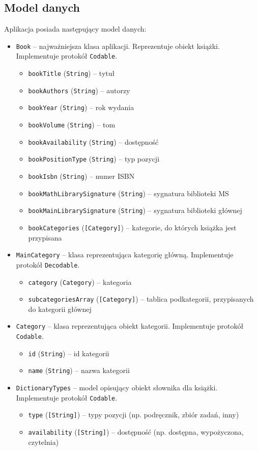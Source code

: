\documentclass[twoside]{projektInzynierskiMS}
\begin{document}
\subsection{Model danych}
Aplikacja posiada następujący model danych:
\begin{itemize}
\item \verb`Book` -- najważniejsza klasa aplikacji. Reprezentuje obiekt książki. Implementuje protokół \verb`Codable`.
\begin{itemize}
\item \verb`bookTitle` (\verb`String`) -- tytuł
\item \verb`bookAuthors` (\verb`String`) -- autorzy
\item \verb`bookYear` (\verb`String`) -- rok wydania
\item \verb`bookVolume` (\verb`String`) -- tom
\item \verb`bookAvailability` (\verb`String`) -- dostępność
\item \verb`bookPositionType` (\verb`String`) -- typ pozycji
\item \verb`bookIsbn` (\verb`String`) -- numer ISBN
\item \verb`bookMathLibrarySignature` (\verb`String`) -- sygnatura biblioteki MS
\item \verb`bookMainLibrarySignature` (\verb`String`) -- sygnatura biblioteki głównej
\item \verb`bookCategories` (\verb`[Category]`) -- kategorie, do których książka jest przypisana
\end{itemize}
\item \verb`MainCategory` -- klasa reprezentująca kategorię główną. Implementuje protokół \verb`Decodable`.
\begin{itemize}
\item \verb`category` (\verb`Category`) -- kategoria
\item \verb`subcategoriesArray` (\verb`[Category]`) -- tablica podkategorii, przypisanych do kategorii głównej
\end{itemize}
\item \verb`Category` -- klasa reprezentująca obiekt kategorii. Implementuje protokół \verb`Codable`.
\begin{itemize}
\item \verb`id` (\verb`String`) -- id kategorii
\item \verb`name` (\verb`String`) -- nazwa kategorii
\end{itemize}
\item \verb`DictionaryTypes` -- model opisujący obiekt słownika dla książki. Implementuje protokół \verb`Codable`.
\begin{itemize}
\item \verb`type` (\verb`[String]`) -- typy pozycji (np. podręcznik, zbiór zadań, inny)
\item \verb`availability` (\verb`[String]`) -- dostępność (np. dostępna, wypożyczona, czytelnia)
\end{itemize}
\end{itemize}
\end{document}
